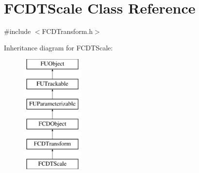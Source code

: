 \hypertarget{classFCDTScale}{
\section{FCDTScale Class Reference}
\label{classFCDTScale}
}


{\ttfamily \#include $<$FCDTransform.h$>$}

Inheritance diagram for FCDTScale:\begin{figure}[H]
\begin{center}
\leavevmode
\includegraphics[height=6.000000cm]{classFCDTScale}
\end{center}
\end{figure}
